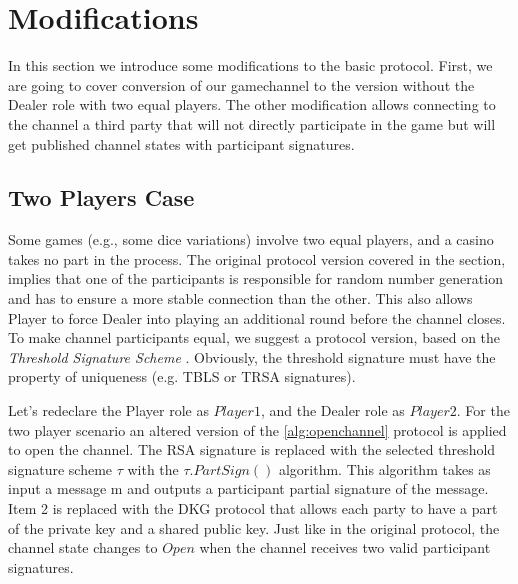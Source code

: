\section{Modifications}
In this section we introduce some modifications to the basic protocol. First, we are going to cover conversion of our gamechannel to the version without the Dealer role with two equal players. The other modification allows connecting to the channel a third party that will not directly participate in the game but will get published channel states with participant signatures. 

\subsection{Two Players Case}
Some games (e.g., some dice variations) involve two equal players, and a casino takes no part in the process. The original protocol version covered in the  section, implies that one of the participants is responsible for random number generation and has to ensure a more stable connection than the other. This also allows Player to force Dealer into playing an additional round before the channel closes. To make channel participants equal, we suggest a protocol version, based on the  \textit {Threshold Signature Scheme} \cite{bib22}. Obviously, the threshold signature must have the property of uniqueness (e.g. TBLS or TRSA \cite{bib23} signatures).

Let’s redeclare the Player role as $Player1$, and the Dealer role as $Player2$. For the two player scenario an altered version of the \autoref{alg:openchannel} protocol is applied to open the channel. The RSA signature is replaced with the selected threshold signature scheme $ \tau $ with the $\tau.PartSign()$ algorithm. This algorithm takes as input a message m and outputs a  participant partial signature of the message. Item 2 is replaced with the DKG protocol that allows each party to have a part of the private key and a shared public key. Just like in the original protocol, the channel state changes to $Open$ when the channel receives two valid participant signatures. 

